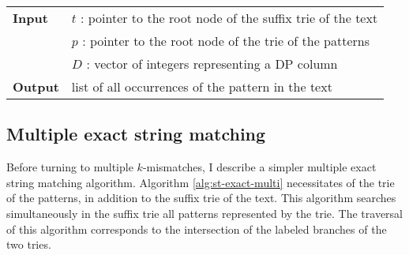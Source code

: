 \begin{center}
\begin{minipage}[t]{.8\textwidth}
\begin{algorithm}[H]
\begin{tabular}{ll}
\textbf{Input}  & $t$ : pointer to the root node of the suffix trie of the text\\
 			    & $p$ : pointer to the root node of the trie of the patterns\\
 			    & $D$ : vector of integers representing a DP column\\
\textbf{Output} & list of all occurrences of the pattern in the text\\
\end{tabular}
\begin{algorithmic}[1]
	\State \Report {}
		\Repeat
			\State {}
			\State {}
			\State {}
	\EndIf
\EndIf
\end{algorithmic}
\label{alg:st-edit}
\end{algorithm}
\end{minipage}
\end{center}



\subsection{Multiple exact string matching}
\label{sec:index:algo:multiexact}

Before turning to multiple $k$-mismatches, I describe a simpler multiple exact string matching algorithm.
Algorithm \ref{alg:st-exact-multi} necessitates of the trie of the patterns, in addition to the suffix trie of the text.
This algorithm searches simultaneously in the suffix trie all patterns represented by the trie.
The traversal of this algorithm corresponds to the intersection of the labeled branches of the two tries.

